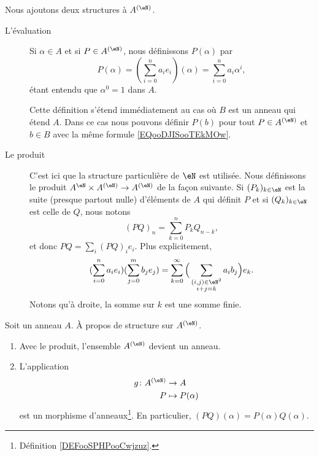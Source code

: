 \begin{definition}      \label{DEFooNXKUooLrGeuh}
	Nous ajoutons deux structures à \( A^{(\eN)}\).
	\begin{description}
		\item[L'évaluation] Si \( \alpha\in A\) et si \( P\in A^{(\eN)}\), nous définissons \( P(\alpha)\) par
		      \begin{equation}        \label{EQooDJISooTEkMOw}
			      P(\alpha)=(\sum_{i=0}^{n}a_ie_i)(\alpha)=\sum_{i=0}^na_i\alpha^i,
		      \end{equation}
		      étant entendu que \( \alpha^0=1\) dans \( A\).

		      Cette définition s'étend immédiatement au cas où \( B\) est un anneau qui étend \( A\). Dans ce cas nous pouvons définir \( P(b)\) pour tout \( P\in A^{(\eN)}\) et \( b\in B\) avec la même formule \eqref{EQooDJISooTEkMOw}.
		\item[Le produit] C'est ici que la structure particulière de \( \eN\) est utilisée. Nous définissons le produit \( A^{\eN}\times A^{(\eN)}\to A^{(\eN)}\) de la façon suivante. Si \( (P_k)_{k\in \eN}\) est la suite (presque partout nulle) d'éléments de \( A\) qui définit \( P\) et si \( (Q_k)_{k\in \eN}\) est celle de \( Q\), nous notons
		      \begin{equation}    \label{EQooTNCSooKklisb}
			      (PQ)_n=\sum_{k=0}^nP_kQ_{n-k},
		      \end{equation}
		      et donc \( PQ=\sum_i(PQ)_ie_i\). Plus explicitement,
		      \begin{equation}    \label{EQooCIBUooAgpxjL}
			      (\sum_{i=0}^na_ie_i)(\sum_{j=0}^mb_je_j)=\sum_{k=0}^{\infty}\Big( \sum_{\substack{  (i,j)\in \eN^2 \\i+j=k}}a_ib_j \Big)e_k.
		      \end{equation}
		      Notons qu'à droite, la somme sur \( k\) est une somme finie.
	\end{description}
\end{definition}

\begin{proposition}     \label{PROPooGDQCooHziCPH}
	Soit un anneau \( A\). À propos de structure sur \( A^{(\eN)}\).
	\begin{enumerate}
		\item
		      Avec le produit, l'ensemble \( A^{(\eN)}\) devient un anneau.
		\item
		      L'application
		      \begin{equation}
			      \begin{aligned}
				      g\colon A^{(\eN)} & \to A             \\
				      P                 & \mapsto P(\alpha)
			      \end{aligned}
		      \end{equation}
		      est un morphisme d'anneaux\footnote{Définition \ref{DEFooSPHPooCwjzuz}.}. En particulier, \( (PQ)(\alpha)=P(\alpha)Q(\alpha)\).
	\end{enumerate}
\end{proposition}

